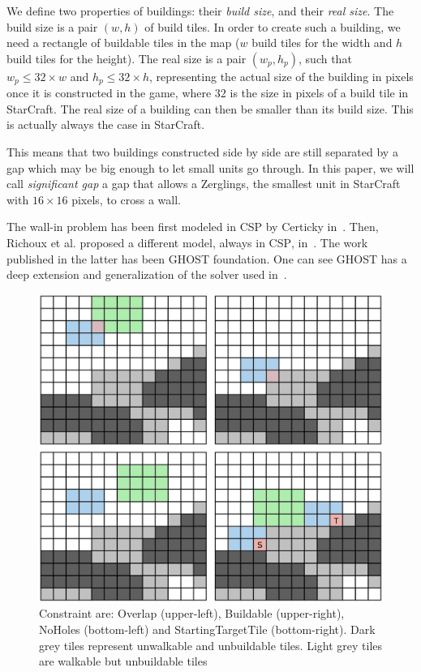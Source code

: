\documentclass[journal]{IEEEtran}
\newcommand{\csp}{\textsc{CSP}\xspace}
\newcommand{\ghost}{\textsc{GHOST}\xspace}
\begin{document}
We define  two properties  of buildings: their  {\em build  size}, and
their {\em  real size}.  The  build size is a  pair $(w, h)$  of build
tiles. In  order to  create such  a building, we  need a  rectangle of
buildable tiles  in the map  ($w$ build tiles for the width and  $h$ build
tiles for the height). The real size is a pair $(w_p, h_p)$, such that $w_p
\leq 32 \times w$ and $h_p  \leq 32 \times h$, representing the actual
size of  the building  in pixels  once it is  constructed in  the game,
where $32$  is the size  in pixels of a  build tile in  StarCraft. The
real size of a building can then  be smaller than its build size. This
is actually always the case in StarCraft.

This  means that  two buildings  constructed  side by  side are  still
separated by a gap  which may be big enough to  let small units go through.
In this paper, we  will call {\it
  significant gap} a gap that allows a Zerglings, the smallest unit in StarCraft with $16 \times 16$ pixels, to
cross a wall.

The  wall-in  problem has  been  first  modeled  in \csp  by  Certicky
in~\cite{Certicky13}. Then, Richoux et al. proposed a different model,
always  in \csp,  in~\cite{RichouxUO14}.   The work  published in  the
latter has  been \ghost  foundation.  One  can see  \ghost has  a deep
extension and generalization of the solver used in~\cite{RichouxUO14}.

\begin{figure}[htb]
  \centering
  \includegraphics[width=\columnwidth]{figs/all_constraints.png}
  \caption{Constraint    are:    Overlap    (upper-left),    Buildable
    (upper-right),   NoHoles   (bottom-left)  and   StartingTargetTile
    (bottom-right).    Dark  grey   tiles  represent   unwalkable  and
    unbuildable tiles.  Light grey  tiles are walkable but unbuildable
    tiles}
  \label{fig:wall_constraint}
\end{figure}
\end{document}
